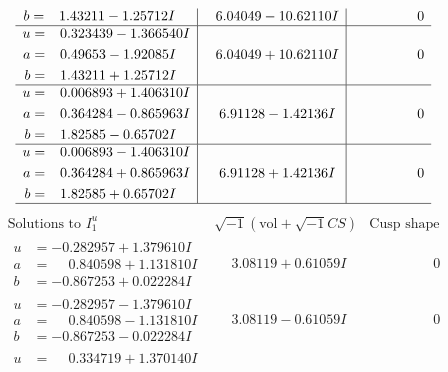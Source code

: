 \documentclass[1p]{elsarticle_modified}
\theoremstyle{definition}
\newcommand{\I}{\sqrt{-1}}
\begin{document}
$$\begin{array}{c|c|c}
\begin{aligned}
b &= \phantom{-}1.43211 - 1.25712 I\end{aligned}
 & \phantom{-}6.04049 - 10.62110 I & \phantom{-0.000000 } 0 \\ \hline\begin{aligned}
u &= \phantom{-}0.323439 - 1.366540 I \\
a &= \phantom{-}0.49653 - 1.92085 I \\
b &= \phantom{-}1.43211 + 1.25712 I\end{aligned}
 & \phantom{-}6.04049 + 10.62110 I & \phantom{-0.000000 } 0 \\ \hline\begin{aligned}
u &= \phantom{-}0.006893 + 1.406310 I \\
a &= \phantom{-}0.364284 - 0.865963 I \\
b &= \phantom{-}1.82585 - 0.65702 I\end{aligned}
 & \phantom{-}6.91128 - 1.42136 I & \phantom{-0.000000 } 0 \\ \hline\begin{aligned}
u &= \phantom{-}0.006893 - 1.406310 I \\
a &= \phantom{-}0.364284 + 0.865963 I \\
b &= \phantom{-}1.82585 + 0.65702 I\end{aligned}
 & \phantom{-}6.91128 + 1.42136 I & \phantom{-0.000000 } 0\\
 \hline 
 \end{array}$$\newpage$$\begin{array}{c|c|c}  
\text{Solutions to }I^u_{1}& \I (\text{vol} + \sqrt{-1}CS) & \text{Cusp shape}\\
 \hline 
\begin{aligned}
u &= -0.282957 + 1.379610 I \\
a &= \phantom{-}0.840598 + 1.131810 I \\
b &= -0.867253 + 0.022284 I\end{aligned}
 & \phantom{-}3.08119 + 0.61059 I & \phantom{-0.000000 } 0 \\ \hline\begin{aligned}
u &= -0.282957 - 1.379610 I \\
a &= \phantom{-}0.840598 - 1.131810 I \\
b &= -0.867253 - 0.022284 I\end{aligned}
 & \phantom{-}3.08119 - 0.61059 I & \phantom{-0.000000 } 0 \\ \hline\begin{aligned}
u &= \phantom{-}0.334719 + 1.370140 I \\

\end{aligned}
\end{array}$$
\end{document}
